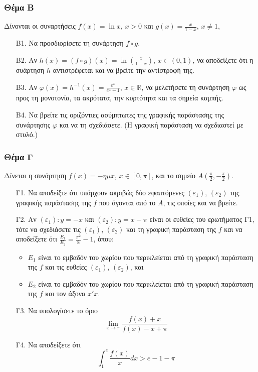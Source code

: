 \documentclass[12pt]{article}
\begin{document}
  \part*{}

  \section*{Θέμα Β}
  Δίνονται οι συναρτήσεις $f(x)=\ln x$, $x>0$ και $g(x)=\frac{x}{1-x}$, $x \ne 1$,
  \begin{enumerate}
    \item [B1.] Να προσδιορίσετε τη συνάρτηση $f\circ g$.
    \item [B2.] Αν $h(x)=(f\circ g)(x)=\ln \left( \frac{x}{1-x}\right)$, $x\in (0,1)$, να αποδείξετε ότι η συάρτηση $h$ αντιστρέφεται και να βρείτε την αντίστροφή της.
    \item [B3.] Αν $φ(x)=h^{-1}(x)=\frac{e^x}{e^x+1}$, $x\in \mathbb{R}$, να μελετήσετε τη συνάρτηση $φ$ ως προς τη μονοτονία, τα ακρότατα, την κυρτότητα και τα σημεία καμπής.
    \item [B4.] Να βρείτε τις οριζόντιες ασύμπτωτες της γραφικής παράστασης της συνάρτησης $φ$ και να τη σχεδιάσετε. (Η γραφική παράσταση να σχεδιαστεί με στυλό.)
  \end{enumerate}

  \section*{Θέμα Γ}
  Δίνεται η συνάρτηση $f(x)=-ημx$, $x\in[0,\pi]$, και το σημείο $Α\left(\frac{\pi}{2},-\frac{\pi}{2}\right)$.
  \begin{enumerate}
    \item [Γ1.] Να αποδείξτε ότι υπάρχουν ακριβώς δύο εφαπτόμενες $(ε_1)$, $(ε_2)$ της γραφικής παράστασης της $f$ που άγονται από το $Α$, τις οποίες και να βρείτε.
    \item [Γ2.] Αν $(ε_1):y=-x$ και  $(ε_2):y=x-\pi$ είναι οι ευθείες του ερωτήματος Γ1, τότε να σχεδιάσετε τις $(ε_1)$, $(ε_2)$ και τη γραφική παράσταση της $f$ και να αποδείξετε ότι $\frac{E_1}{E_2}=\frac{\pi^2}{8}-1$, όπου:
      \begin{itemize}
        \item $E_1$ είναι το εμβαδόν του χωρίου που περικλείεται από τη γραφική παράσταση της $f$ και τις ευθείες $(ε_1)$, $(ε_2)$, και
        \item $E_2$ είναι το εμβαδόν του χωρίου που περικλείεται από τη γραφική παράσταση της $f$ και τον άξονα $x'x$.
      \end{itemize}
    \item [Γ3.] Να υπολογίσετε το όριο \[ \lim_{x\to \pi} \frac{f(x)+x}{f(x)-x+\pi} \]
    \item [Γ4.] Να αποδείξετε ότι \[ \int_{1}^{e}\frac{f(x)}{x}dx > e-1-\pi \]
  \end{enumerate}
\end{document}
